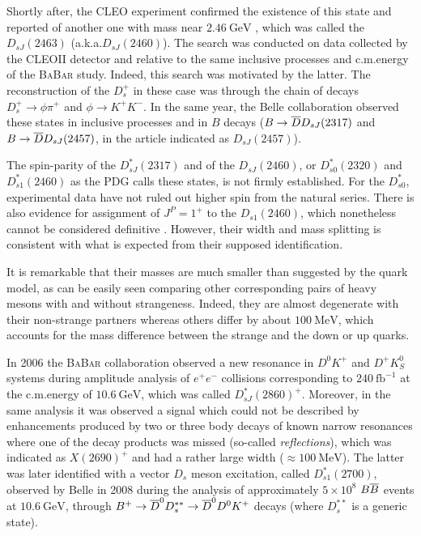 Shortly after, the CLEO experiment confirmed the existence of this state and reported of another one with mass near $2.46 \ \text{GeV}$ \cite{Besson:2003cp}, which was called the $D_{s J}(2463)$ (a.k.a.\@ $D_{s J}(2460)$). The search was conducted on data collected by the CLEOII detector and relative to the same inclusive processes and c.m.\@ energy of the \textsc{BaBar} study. Indeed, this search was motivated by the latter. The reconstruction of the $D_s^+$ in these case was through the chain of decays $D_s^+ \to \phi \pi^+$ and $\phi \to K^+ K^-$. In the same year, the Belle collaboration observed these states in inclusive processes \cite{Abe:2003jk} and in $B$ decays \cite{Krokovny:2003zq} ($B \to \overline{D} D_{s J} (2317)$ and $B \to \overline{D} D_{s J}(2457)$, in the article indicated as $D_{s J}(2457)$).

The spin-parity of the $D^*_{s J}(2317)$ and of the $D_{s J}(2460)$, or $D^*_{s 0}(2320)$ and $D^*_{s 1}(2460)$ as the PDG calls these states, is not firmly established. For the $D^*_{s 0}$, experimental data have not ruled out higher spin from the natural series. There is also evidence for assignment of $J^P = 1^+$ to the $D_{s1}(2460)$, which nonetheless cannot be considered definitive \cite{Aubert:2006bk}. However, their width and mass splitting is consistent with what is expected from their supposed identification. 

It is remarkable that their masses are much smaller than suggested by the quark model, as can be easily seen comparing other corresponding pairs of heavy mesons with and without strangeness. Indeed, they are almost degenerate with their non-strange partners whereas others differ by about $100 \ \text{MeV}$, which accounts for the mass difference between the strange and the down or up quarks.

In 2006 the \textsc{BaBar} collaboration observed a new resonance in $D^0 K^+$ and $D^+ K^0_S$ systems \cite{Aubert:2006mh} during amplitude analysis of $e^+ e^-$ collisions corresponding to $240 \ \text{fb}^{-1}$ at the c.m.\@ energy of $10.6 \ \text{GeV}$, which was called $D^*_{s J}(2860)^+$. Moreover, in the same analysis it was observed a signal which could not be described by enhancements produced by two or three body decays of known narrow resonances where one of the decay products was missed (so-called \emph{reflections}), which was indicated as $X(2690)^+$ and had a rather large width ($\approx 100 \ \text{MeV}$). The latter was later identified with a vector $D_s$ meson excitation, called $D^*_{s 1}(2700)$, observed by Belle in 2008 \cite{Brodzicka:2007aa} during the analysis of approximately $5 \times 10^8$ $B \overline{B}$ events at $10.6 \ \text{GeV}$, through $B^+ \to \overline{D}^0 D^{**}_s \to \overline{D}^0 D^0 K^+$ decays (where $D_s^{**}$ is a generic state).

